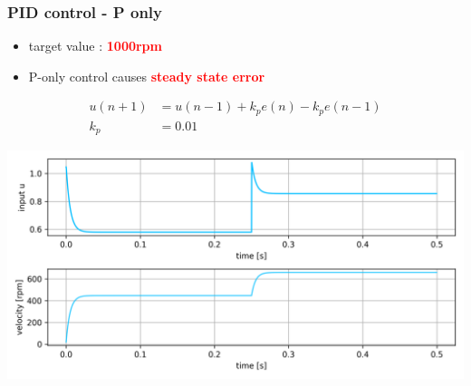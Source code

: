 \documentclass{beamer}
\begin{document}
\begin{frame}
  
  \frametitle{\bf PID control - P only}

  \begin{itemize}
    \item  target value : \textcolor{red}{\bf 1000rpm}
    \item  P-only control causes \textcolor{red}{\bf steady state error}
  \end{itemize}
  
 
  \begin{align*}
    u(n+1) &= u(n-1) + k_pe(n) - k_pe(n-1) \\
    k_p    &= 0.01
  \end{align*}

  {\centering \includegraphics[scale=0.4]{../images/motor_control/pid_p_control.png}}

\end{frame}
\end{document}
